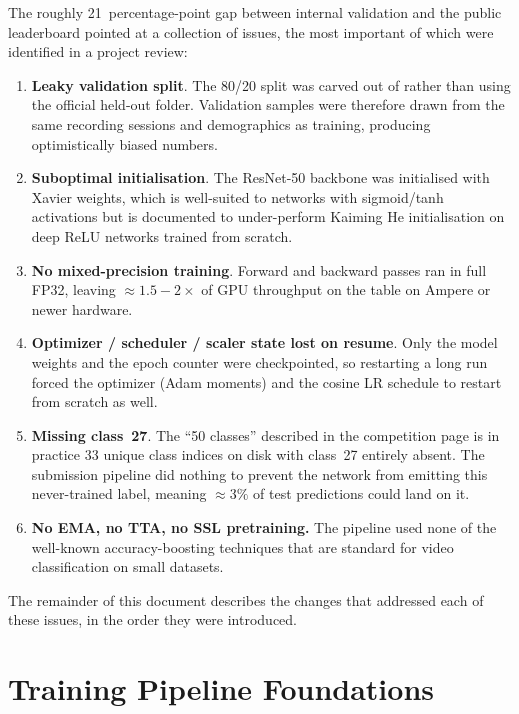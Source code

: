 The roughly 21~percentage-point gap between internal validation and the
public leaderboard pointed at a collection of issues, the most important
of which were identified in a project review:

\begin{enumerate}[leftmargin=*]
\item \textbf{Leaky validation split}. The 80/20 split was carved out of
       rather than using the official held-out
       folder. Validation samples were therefore drawn
      from the same recording sessions and demographics as training,
      producing optimistically biased numbers.
\item \textbf{Suboptimal initialisation}. The ResNet-50 backbone was
      initialised with Xavier weights, which is well-suited to networks
      with sigmoid/tanh activations but is documented to under-perform
      Kaiming He initialisation on deep ReLU networks trained from
      scratch.
\item \textbf{No mixed-precision training}. Forward and backward passes
      ran in full FP32, leaving \(\approx 1.5{-}2\times\) of GPU
      throughput on the table on Ampere or newer hardware.
\item \textbf{Optimizer / scheduler / scaler state lost on resume}. Only
      the model weights and the epoch counter were checkpointed, so
      restarting a long run forced the optimizer (Adam moments) and the
      cosine LR schedule to restart from scratch as well.
\item \textbf{Missing class~27}. The ``50 classes'' described in the
      competition page is in practice 33 unique class indices on disk
      with class~27 entirely absent. The submission pipeline did nothing
      to prevent the network from emitting this never-trained label,
      meaning \(\approx 3\%\) of test predictions could land on it.
\item \textbf{No EMA, no TTA, no SSL pretraining.} The pipeline used
      none of the well-known accuracy-boosting techniques that are
      standard for video classification on small datasets.
\end{enumerate}

The remainder of this document describes the changes that addressed each
of these issues, in the order they were introduced.

\section{Training Pipeline Foundations}
\label{sec:phase1}

